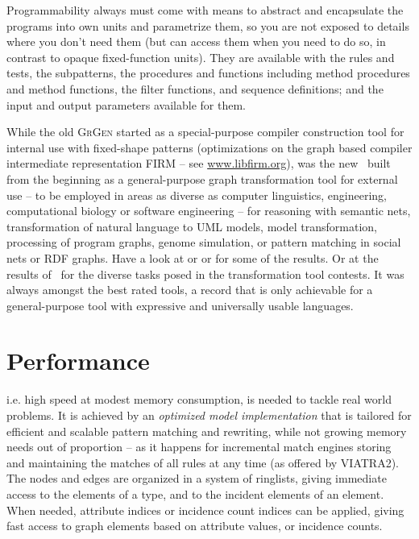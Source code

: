 Programmability always must come with means to abstract and encapsulate the programs into own units and parametrize them, so you are not exposed to details where you don't need them (but can access them when you need to do so, in contrast to opaque fixed-function units).
They are available with the rules and tests, the subpatterns, the procedures and functions including method procedures and method functions, the filter functions, and sequence definitions; and the input and output parameters available for them.

While the old \textsc{GrGen} started as a special-purpose compiler construction tool for internal use with fixed-shape patterns 
(optimizations on the graph based compiler intermediate representation FIRM -- see \url{www.libfirm.org}),
was the new \GrG\ built from the beginning as a general-purpose graph transformation tool for external use
-- to be employed in areas as diverse as computer linguistics, engineering, computational biology or software engineering --
for reasoning with semantic nets, transformation of natural language to UML models,
model transformation, processing of program graphs, genome simulation, or pattern matching in social nets or RDF graphs.
Have a look at \cite{usecomputerlinguistics} or \cite{usemodeltransformation} or \cite{usegeneexpression} for some of the results.
Or at the results of \GrG\ for the diverse tasks posed in the transformation tool contests. 
It was always amongst the best rated tools, a record that is only achievable for a general-purpose tool with expressive and universally usable languages.

\section{Performance}
i.e. high speed at modest memory consumption, is needed to tackle real world problems.
It is achieved by an \emph{optimized model implementation} that is tailored for efficient and scalable pattern matching and rewriting,
while not growing memory needs out of proportion -- as it happens for incremental match engines storing and maintaining the matches of all rules at any time (as offered by VIATRA2\cite{viatra2}).
The nodes and edges are organized in a system of ringlists, giving immediate access to the elements of a type, and to the incident elements of an element.
When needed, attribute indices or incidence count indices can be applied, giving fast access to graph elements based on attribute values, or incidence counts.

